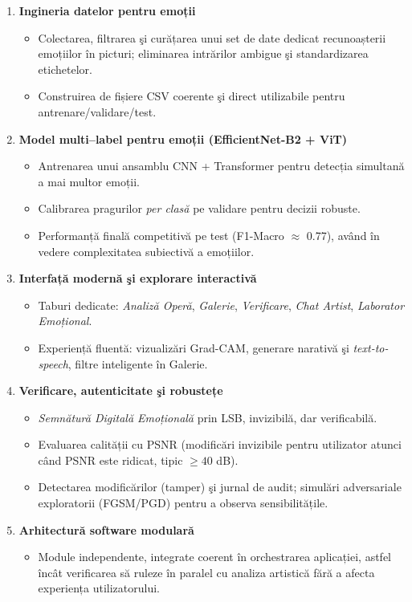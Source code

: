 \begin{enumerate}
  \item \textbf{Ingineria datelor pentru emoții}
  \begin{itemize}
    \item Colectarea, filtrarea şi curățarea unui set de date dedicat recunoașterii emoțiilor în picturi; eliminarea intrărilor ambigue şi standardizarea etichetelor.
    \item Construirea de fișiere CSV coerente şi direct utilizabile pentru antrenare/validare/test.
  \end{itemize}

  \item \textbf{Model multi--label pentru emoții (EfficientNet-B2 + ViT)}
  \begin{itemize}
    \item Antrenarea unui ansamblu CNN + Transformer pentru detecția simultană a mai multor emoții.
    \item Calibrarea pragurilor \emph{per clasă} pe validare pentru decizii robuste.
    \item Performanță finală competitivă pe test (F1-Macro $\approx$ 0.77), având în vedere complexitatea subiectivă a emoțiilor.
  \end{itemize}

  \item \textbf{Interfață modernă şi explorare interactivă}
  \begin{itemize}
    \item Taburi dedicate: \emph{Analiză Operă}, \emph{Galerie}, \emph{Verificare}, \emph{Chat Artist}, \emph{Laborator Emoțional}.
    \item Experiență fluentă: vizualizări Grad-CAM, generare narativă şi \emph{text-to-speech}, filtre inteligente în Galerie.
  \end{itemize}

  \item \textbf{Verificare, autenticitate şi robustețe}
  \begin{itemize}
    \item \emph{Semnătură Digitală Emoțională} prin LSB, invizibilă, dar verificabilă.
    \item Evaluarea calității cu PSNR (modificări invizibile pentru utilizator atunci când PSNR este ridicat, tipic $\geq 40$ dB).
    \item Detectarea modificărilor (tamper) şi jurnal de audit; simulări adversariale exploratorii (FGSM/PGD) pentru a observa sensibilitățile.
  \end{itemize}

  \item \textbf{Arhitectură software modulară}
  \begin{itemize}
    \item Module independente, integrate coerent în orchestrarea aplicației, astfel încât verificarea să ruleze în paralel cu analiza artistică fără a afecta experiența utilizatorului.
  \end{itemize}
\end{enumerate}


